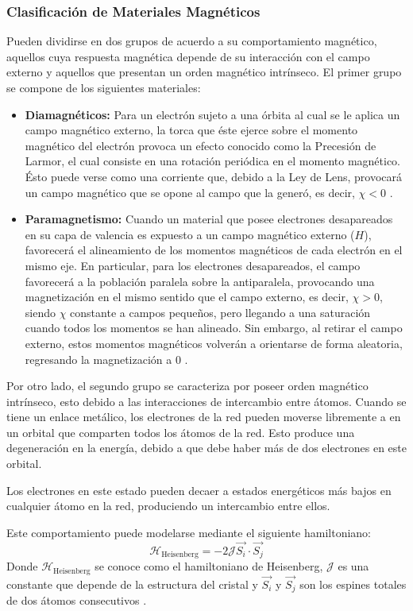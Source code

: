 \documentclass[../main.tex]{subfiles}
\begin{document}
\subsubsection{Clasificación de Materiales Magnéticos}
Pueden dividirse en dos grupos de acuerdo a su comportamiento magnético, aquellos cuya respuesta magnética depende de su interacción con el campo externo y aquellos que presentan un orden magnético intrínseco. El primer grupo se compone de los siguientes materiales:
\begin{itemize}
    \item \textbf{Diamagnéticos:} Para un electrón sujeto a una órbita al cual se le aplica un campo magnético externo, la torca que éste ejerce sobre el momento magnético del electrón provoca un efecto conocido como la Precesión de Larmor, el cual consiste en una rotación periódica en el momento magnético. Ésto puede verse como una corriente que, debido a la Ley de Lens, provocará un campo magnético que se opone al campo que la generó, es decir, $\chi<0$ \cite{coey2010magnetism}.
    \item \textbf{Paramagnetismo:} Cuando un material que posee electrones desapareados en su capa de valencia es expuesto a un campo magnético externo ($H$), favorecerá el alineamiento de los momentos magnéticos de cada electrón en el mismo eje. En particular, para los electrones desapareados, el campo favorecerá a la población paralela sobre la antiparalela, provocando una magnetización en el mismo sentido que el campo externo, es decir, $\chi>0$, siendo $\chi$ constante a campos pequeños, pero llegando a una saturación cuando todos los momentos se han alineado. Sin embargo, al retirar el campo externo, estos momentos magnéticos volverán a orientarse de forma aleatoria, regresando la magnetización a 0 \cite{coey2010magnetism}.
\end{itemize}
Por otro lado, el segundo grupo se caracteriza por poseer orden magnético intrínseco, esto debido a las interacciones de intercambio entre átomos. Cuando se tiene un enlace metálico, los electrones de la red pueden moverse libremente a en un orbital que comparten todos los átomos de la red. Esto produce una degeneración en la energía, debido a que debe haber más de dos electrones en este orbital.

Los electrones en este estado pueden decaer a estados energéticos más bajos en cualquier átomo en la red, produciendo un intercambio entre ellos.

Este comportamiento puede modelarse mediante el siguiente hamiltoniano:
\begin{equation}
    \mathcal{H}_{\text{Heisenberg}}=-2\mathcal{J}\vec{S_i}\cdot\vec{S_j}
    \label{eq:heisenberginterc}
\end{equation}
Donde $\mathcal{H}_{\text{Heisenberg}}$ se conoce como el hamiltoniano de Heisenberg, $\mathcal{J}$ es una constante que depende de la estructura del cristal y $\vec{S_i}$ y $\vec{S_j}$ son los espines totales de dos átomos consecutivos \cite{coey2010magnetism}.
\end{document}
